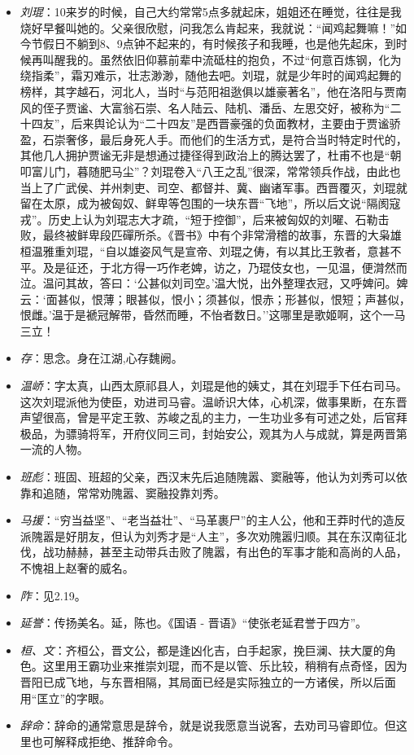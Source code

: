 \documentclass[]{book}
\providecommand{\tightlist}{%
  \setlength{\itemsep}{0pt}\setlength{\parskip}{0pt}}
\begin{document}
\begin{itemize}
\tightlist
\item
  \emph{刘琨}：10来岁的时候，自己大约常常5点多就起床，姐姐还在睡觉，往往是我烧好早餐叫她的。父亲很欣慰，问我怎么肯起来，我就说：``闻鸡起舞嘛！''如今节假日不躺到8、9点钟不起来的，有时候孩子和我睡，也是他先起床，到时候再叫醒我的。虽然依旧仰慕前辈中流砥柱的抱负，不过``何意百炼钢，化为绕指柔''，霜刃难示，壮志渺渺，随他去吧。刘琨，就是少年时的闻鸡起舞的榜样，其字越石，河北人，当时``与范阳祖逖俱以雄豪著名''，他在洛阳与贾南风的侄子贾谧、大富翁石崇、名人陆云、陆机、潘岳、左思交好，被称为``二十四友''，后来舆论认为``二十四友''是西晋豪强的负面教材，主要由于贾谧骄盈，石崇奢侈，最后身死人手。而他们的生活方式，是符合当时特定时代的，其他几人拥护贾谧无非是想通过捷径得到政治上的腾达罢了，杜甫不也是``朝叩富儿门，暮随肥马尘''？刘琨卷入``八王之乱''很深，常常领兵作战，由此也当上了广武侯、并州刺吏、司空、都督并、冀、幽诸军事。西晋覆灭，刘琨就留在太原，成为被匈奴、鲜卑等包围的一块东晋``飞地''，所以后文说``隔阂寇戎''。历史上认为刘琨志大才疏，``短于控御''，后来被匈奴的刘曜、石勒击败，最终被鲜卑段匹磾所杀。《晋书》中有个非常滑稽的故事，东晋的大枭雄桓温雅重刘琨，``自以雄姿风气是宣帝、刘琨之俦，有以其比王敦者，意甚不平。及是征还，于北方得一巧作老婢，访之，乃琨伎女也，一见温，便潸然而泣。温问其故，答曰：`公甚似刘司空。'温大悦，出外整理衣冠，又呼婢问。婢云：`面甚似，恨薄；眼甚似，恨小；须甚似，恨赤；形甚似，恨短；声甚似，恨雌。'温于是褫冠解带，昏然而睡，不怡者数日。''这哪里是歌姬啊，这个一马三立！
\item
  \emph{存}：思念。身在江湖,心存魏阙。
\item
  \emph{温峤}：字太真，山西太原祁县人，刘琨是他的姨丈，其在刘琨手下任右司马。这次刘琨派他为使臣，劝进司马睿。温峤识大体，心机深，做事果断，在东晋声望很高，曾是平定王敦、苏峻之乱的主力，一生功业多有可述之处，后官拜极品，为骠骑将军，开府仪同三司，封始安公，观其为人与成就，算是两晋第一流的人物。
\item
  \emph{班彪}：班固、班超的父亲，西汉末先后追随隗嚣、窦融等，他认为刘秀可以依靠和追随，常常劝隗嚣、窦融投靠刘秀。
\item
  \emph{马援}：``穷当益坚''、``老当益壮''、``马革裹尸''的主人公，他和王莽时代的造反派隗嚣是好朋友，但认为刘秀才是``人主''，多次劝隗嚣归顺。其在东汉南征北伐，战功赫赫，甚至主动带兵击败了隗嚣，有出色的军事才能和高尚的人品，不愧祖上赵奢的威名。
\item
  \emph{阼}：见2.19。
\item
  \emph{延誉}：传扬美名。延，陈也。《国语 -
  晋语》``使张老延君誉于四方''。
\item
  \emph{桓、文}：齐桓公，晋文公，都是逢凶化吉，白手起家，挽巨澜、扶大厦的角色。这里用王霸功业来推崇刘琨，而不是以管、乐比较，稍稍有点奇怪，因为晋阳已成飞地，与东晋相隔，其局面已经是实际独立的一方诸侯，所以后面用``匡立''的字眼。
\item
  \emph{辞命}：辞命的通常意思是辞令，就是说我愿意当说客，去劝司马睿即位。但这里也可解释成拒绝、推辞命令。
\end{itemize}
\end{document}
